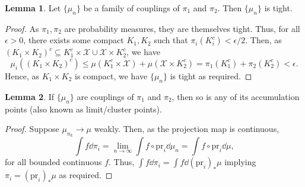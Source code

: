 \documentclass[]{article}
\theoremstyle{definition}
\theoremstyle{definition}
\newtheorem{lemma}{Lemma}[section]
\begin{document}
\begin{lemma}
  Let \(\{\mu_n\}\) be a family of couplings of \(\pi_1\) and \(\pi_2\). Then 
  \(\{\mu_n\}\) is tight.
\end{lemma}
\begin{proof}
  As \(\pi_1, \pi_2\) are probability measures, they are themselves tight. Thus, 
  for all \(\epsilon > 0\), there exists some compact \(K_1, K_2\) such that 
  \(\pi_i(K_i^c) < \epsilon / 2\). Then, as \((K_1 \times K_2)^c \subseteq 
  K_1^c \times \mathcal{X} \cup \mathcal{X} \times K_2^c\), we have 
  \[\mu_i((K_1 \times K_2)^c) \le \mu(K_1^c \times \mathcal{X}) + \mu(\mathcal{X} \times K_2^c)
    = \pi_1(K_1^c) + \pi_2(K_2^c) < \epsilon.\]
  Hence, as \(K_1 \times K_2\) is compact, we have \(\{\mu_n\}\) is tight as required.
\end{proof}

\begin{lemma}
  If \(\{\mu_n\}\) are couplings of \(\pi_1\) and \(\pi_2\), then so is any of 
  its accumulation points (also known as limit/cluster points).
\end{lemma}
\begin{proof}
  Suppose \(\mu_{n_k} \to \mu\) weakly. Then, as the projection map is continuous, 
  \[\int f \dd \pi_i = \lim_{n \to \infty} \int f \circ \text{pr}_i \dd \mu_n
    = \int f \circ \text{pr}_i \dd \mu,\]
  for all bounded continuous \(f\). Thus, \(\int f \dd \pi_i = \int f \dd (\text{pr}_i)_* \mu\)
  implying \(\pi_i = (\text{pr}_i)_* \mu\) as required.
\end{proof}
\end{document}
